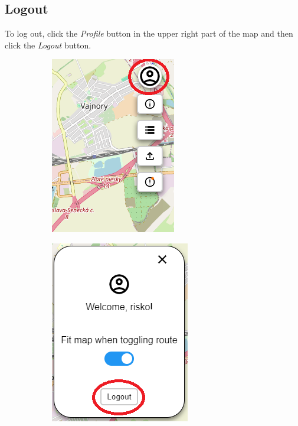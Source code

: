 \subsection{Logout}
To log out, click the \textit{Profile} button in the upper right part of the map and then click the \textit{Logout} button.
\begin{figure}[H]
     \centering
     \begin{subfigure}{0.45\textwidth}
         \centering
         \includegraphics[width=.7\textwidth]{guide_includes/img/profile_button.png}
     \end{subfigure}
     \begin{subfigure}{0.45\textwidth}
         \centering
         \includegraphics[width=.7\textwidth]{guide_includes/img/logout_button.png}
     \end{subfigure}
\end{figure}

